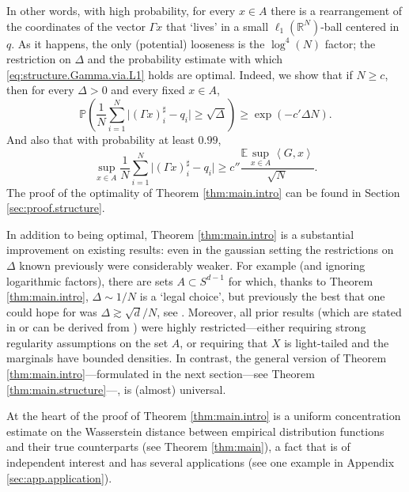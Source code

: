 \documentclass[11pt]{amsart}
\newcommand{\R}{\mathbb{R}}
\newcommand{\inr}[1]{\left\langle #1 \right\rangle}
\theoremstyle{definition}
\newcommand{\E}{\mathbb{E}}
\renewcommand{\P}{\mathbb{P}}
\numberwithin{equation}{section}
\begin{document}
In other words, with high probability, for every $x\in A$ there is a rearrangement of the coordinates of the vector $\Gamma x$ that `lives' in a small $\ell_1(\R^N)$-ball centered in $q$. 
As it happens, the only (potential) looseness is the $\log^4 (N)$ factor; the restriction on $\Delta$ and the probability estimate with which \eqref{eq:structure.Gamma.via.L1} holds are optimal. Indeed, we show that if $N\geq c$, then for every $\Delta>0$ and every fixed $x\in A$,
\[
\P\!\left( \frac{1}{N}\sum_{i=1}^N \big|(\Gamma x)^\sharp_i - q_i\big| \ge \sqrt{\Delta} \right)
\ge \exp(-c'\Delta N).
\]
And also that with probability at least $0.99$,
\[
\sup_{x\in A} \frac{1}{N}\sum_{i=1}^N \big|(\Gamma x)^\sharp_i - q_i\big|
\ge c'' \frac{\E \sup_{x\in A} \inr{G,x}}{\sqrt{N}}.
\]
The proof of the optimality of Theorem \ref{thm:main.intro} can be found in Section \ref{sec:proof.structure}. 

\vskip0.3cm


In addition to being optimal, Theorem \ref{thm:main.intro} is a substantial improvement on existing results: even in the gaussian setting the restrictions on $\Delta$ known previously were considerably weaker. 
For example (and ignoring logarithmic factors), there are sets $A\subset S^{d-1}$ for which, thanks to Theorem \ref{thm:main.intro}, $\Delta \sim 1/N $ is a `legal choice', but previously the best that one could hope for was $\Delta \gtrsim\sqrt d /N $, see \cite{bartl2025empirical}.
Moreover, all prior results (which are stated in or can be derived from \cite{bartl2022structure,bartl2025uniform,boedihardjo2025sharp,gine2006concentration,lugosi2024multivariate,olea2022generalization}) were highly restricted---either requiring strong regularity assumptions on the set $A$, or requiring that $X$ is light-tailed and the marginals have bounded densities. In contrast, the general version of Theorem \ref{thm:main.intro}---formulated in the next section---see Theorem \ref{thm:main.structure}---, is (almost) universal.

At the heart of the proof of Theorem \ref{thm:main.intro} is a uniform concentration estimate on the Wasserstein distance between empirical distribution functions and their true counterparts (see Theorem \ref{thm:main}), a fact that is of independent interest and has several applications (see one example in Appendix \ref{sec:app.application}).
\end{document}
